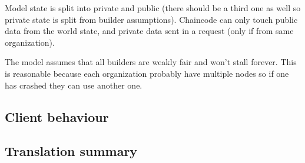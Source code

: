 \documentclass[english, biblatex, digitaloutput]{kththesis}
\begin{document}
Model state is split into private and public (there should be a third one as well so private state is split from builder assumptions). Chaincode can only touch public data from the world state, and private data sent in a request (only if from same organization).

The model assumes that all builders are weakly fair and won't stall forever. This is reasonable because each organization probably have multiple nodes so if one has crashed they can use another one.

\subsection{Client behaviour}

\subsection{Translation summary}







\end{document}
